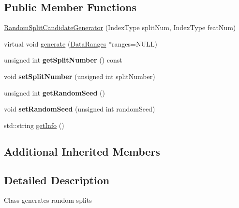 \subsection*{Public Member Functions}
\begin{DoxyCompactItemize}
\item 
\hyperlink{classffactory_1_1_random_split_candidate_generator_a7ac06ac7c9e728347f6cb40d1032d642}{Random\-Split\-Candidate\-Generator} (Index\-Type split\-Num, Index\-Type feat\-Num)
\item 
virtual void \hyperlink{classffactory_1_1_random_split_candidate_generator_a488f87c1cc5ddccc44d5827db6f02964}{generate} (\hyperlink{classffactory_1_1_data_ranges}{Data\-Ranges} $\ast$ranges=N\-U\-L\-L)
\item 
\hypertarget{classffactory_1_1_random_split_candidate_generator_ac18baf9a950270a1971450639eb07bd9}{unsigned int {\bfseries get\-Split\-Number} () const }\label{classffactory_1_1_random_split_candidate_generator_ac18baf9a950270a1971450639eb07bd9}

\item 
\hypertarget{classffactory_1_1_random_split_candidate_generator_a2639b83da4a7b30b5d3a45d3840ba5ee}{void {\bfseries set\-Split\-Number} (unsigned int split\-Number)}\label{classffactory_1_1_random_split_candidate_generator_a2639b83da4a7b30b5d3a45d3840ba5ee}

\item 
\hypertarget{classffactory_1_1_random_split_candidate_generator_abe262a149a84cb1a1c73acecd9c4bd42}{unsigned int {\bfseries get\-Random\-Seed} ()}\label{classffactory_1_1_random_split_candidate_generator_abe262a149a84cb1a1c73acecd9c4bd42}

\item 
\hypertarget{classffactory_1_1_random_split_candidate_generator_a2cad77875ce9f7b94c897939b181bb37}{void {\bfseries set\-Random\-Seed} (unsigned int random\-Seed)}\label{classffactory_1_1_random_split_candidate_generator_a2cad77875ce9f7b94c897939b181bb37}

\item 
std\-::string \hyperlink{classffactory_1_1_random_split_candidate_generator_ab5ec1be9458ea7f7626f47bce9754bd6}{get\-Info} ()
\end{DoxyCompactItemize}
\subsection*{Additional Inherited Members}


\subsection{Detailed Description}
Class generates random splits 

